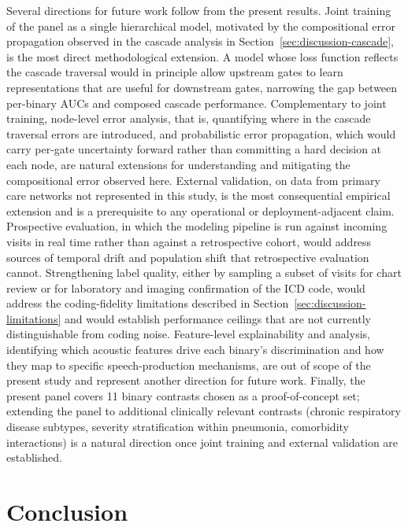 \documentclass[utf8]{FrontiersinHarvard} %
\begin{document}
Several directions for future work follow from the present results. Joint training of the panel as a single hierarchical model, motivated by the compositional error propagation observed in the cascade analysis in Section~\ref{sec:discussion-cascade}, is the most direct methodological extension. A model whose loss function reflects the cascade traversal would in principle allow upstream gates to learn representations that are useful for downstream gates, narrowing the gap between per-binary AUCs and composed cascade performance. Complementary to joint training, node-level error analysis, that is, quantifying where in the cascade traversal errors are introduced, and probabilistic error propagation, which would carry per-gate uncertainty forward rather than committing a hard decision at each node, are natural extensions for understanding and mitigating the compositional error observed here. External validation, on data from primary care networks not represented in this study, is the most consequential empirical extension and is a prerequisite to any operational or deployment-adjacent claim. Prospective evaluation, in which the modeling pipeline is run against incoming visits in real time rather than against a retrospective cohort, would address sources of temporal drift and population shift that retrospective evaluation cannot. Strengthening label quality, either by sampling a subset of visits for chart review or for laboratory and imaging confirmation of the ICD code, would address the coding-fidelity limitations described in Section~\ref{sec:discussion-limitations} and would establish performance ceilings that are not currently distinguishable from coding noise. Feature-level explainability and analysis, identifying which acoustic features drive each binary's discrimination and how they map to specific speech-production mechanisms, are out of scope of the present study and represent another direction for future work. Finally, the present panel covers 11 binary contrasts chosen as a proof-of-concept set; extending the panel to additional clinically relevant contrasts (chronic respiratory disease subtypes, severity stratification within pneumonia, comorbidity interactions) is a natural direction once joint training and external validation are established.


\section{Conclusion}
\label{sec:conclusion}
\end{document}

